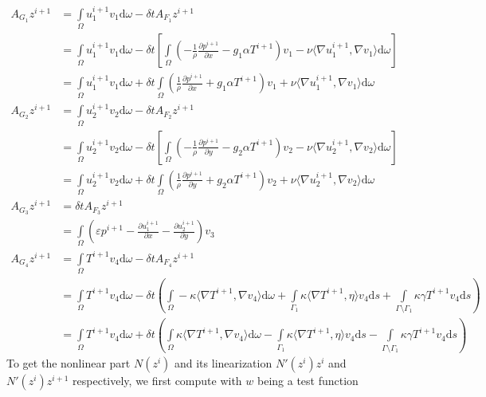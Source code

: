 \documentclass{article}
\begin{document}
\begin{align*}
A_{G_1}z^{i+1} &= \int\limits_\Omega u_1^{i+1} v_1 \text{d}\omega - \delta tA_{F_1}z^{i+1} \\
&= \int\limits_\Omega u_1^{i+1} v_1 \text{d}\omega - \delta t\left[\int\limits_\Omega \left(-\frac{1}{\rho}\frac{\partial p^{i+1}}{\partial x}-g_1\alpha T^{i+1}\right)v_1 - \nu\langle \nabla u_1^{i+1},\nabla v_1\rangle \text{d}\omega\right]\\
&= \int\limits_\Omega u_1^{i+1} v_1 \text{d}\omega + \delta t\int\limits_\Omega \left(\frac{1}{\rho}\frac{\partial p^{i+1}}{\partial x}+g_1\alpha T^{i+1}\right)v_1 + \nu\langle \nabla u_1^{i+1},\nabla v_1\rangle \text{d}\omega\\
A_{G_2}z^{i+1} &= \int\limits_\Omega u_2^{i+1} v_2 \text{d}\omega - \delta tA_{F_2}z^{i+1} \\
&= \int\limits_\Omega u_2^{i+1} v_2 \text{d}\omega - \delta t\left[\int\limits_\Omega \left(-\frac{1}{\rho}\frac{\partial p^{i+1}}{\partial y}-g_2\alpha T^{i+1}\right)v_2 - \nu\langle \nabla u_2^{i+1},\nabla v_2\rangle \text{d}\omega\right]\\
&= \int\limits_\Omega u_2^{i+1} v_2 \text{d}\omega + \delta t\int\limits_\Omega \left(\frac{1}{\rho}\frac{\partial p^{i+1}}{\partial y}+g_2\alpha T^{i+1}\right)v_2 + \nu\langle \nabla u_2^{i+1},\nabla v_2\rangle \text{d}\omega\\
A_{G_3}z^{i+1} &= \delta tA_{F_3} z^{i+1} \\
&= \int\limits_\Omega (\varepsilon p^{i+1} - \frac{\partial u_1^{i+1}}{\partial x} - \frac{\partial u_2^{i+1}}{\partial y})v_3\\
A_{G_4}z^{i+1} &= \int\limits_\Omega T^{i+1} v_4 \text{d}\omega - \delta tA_{F_4}z^{i+1} \\
&= \int\limits_\Omega T^{i+1} v_4 \text{d}\omega -\delta t\left(\int\limits_\Omega -\kappa \langle \nabla T^{i+1},\nabla v_4\rangle \text{d}\omega + \int\limits_{\Gamma_1} \kappa\langle \nabla T^{i+1},\eta\rangle v_4 \text{d}s + \int\limits_{\Gamma \setminus \Gamma_1}\kappa\gamma T^{i+1}v_4\text{d}s\right) \\
&= \int\limits_\Omega T^{i+1} v_4 \text{d}\omega +\delta t\left( \int\limits_\Omega \kappa \langle \nabla T^{i+1},\nabla v_4\rangle \text{d}\omega - \int\limits_{\Gamma_1} \kappa\langle \nabla T^{i+1},\eta\rangle v_4 \text{d}s - \int\limits_{\Gamma \setminus \Gamma_1}\kappa\gamma T^{i+1}v_4\text{d}s\right)
\end{align*}
To get the nonlinear part $N(z^i)$ and its linearization $N'(z^i)z^i$ and $N'(z^i)z^{i+1}$ respectively, we first compute with $w$ being a test function
\end{document}
